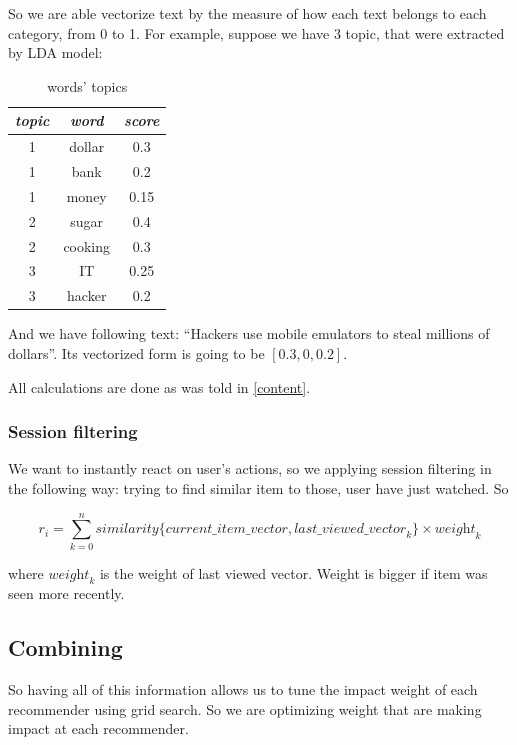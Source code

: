 \documentclass{article}
\begin{document}
So we are able vectorize text by the measure of how each text belongs to each category, from 0 to 1.
For example, suppose we have 3 topic, that were extracted by LDA model:

\begin{table}[h]
\centering
\begin{tabular}{ccc}
    \toprule
\textit{topic} & \textit{word} & \textit{score} \\
    \midrule
1 & dollar & 0.3 \\
1 & bank & 0.2 \\
1 & money & 0.15 \\
2 & sugar & 0.4 \\
2 & cooking & 0.3 \\
3 & IT & 0.25 \\
3 & hacker & 0.2 \\
\bottomrule
\end{tabular}%
\caption{words' topics}
\label{tab:words_topics}
\end{table}

And we have following text: ``Hackers use mobile emulators to steal millions of dollars''. Its vectorized form is going to be $[0.3, 0, 0.2]$.

All calculations are done as was told in \ref{content}.


\subsubsection{Session filtering}

We want to instantly react on user's actions, so we applying session filtering in the following way:
trying to find similar item to those, user have just watched. So 

\begin{equation}
    r_{i}=\sum_{k=0}^{n} \textit{similarity}\{\textit{current\_item\_vector}, \textit{last\_viewed\_vector}_{k}\} \times \textit{weight}_k
\end{equation}


where $\textit{weight}_k$ is the weight of last viewed vector. Weight is bigger if item was seen more recently.



\subsection{Combining}

    So having all of this information allows us to tune the impact weight of each recommender using grid search. So we are optimizing weight that are making impact at each recommender.
\end{document}
